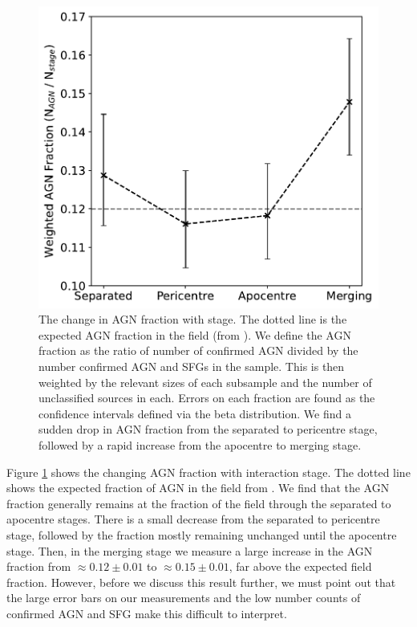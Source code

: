 \begin{figure}
\centering
\includegraphics[width=\textwidth]{Chapter3/figures/agn-frac-time.pdf}
\caption[The change in AGN fraction with stage.]{The change in AGN fraction with stage. The dotted line is the expected AGN fraction in the field (from \citet{2008AJ....135.1877E}). We define the AGN fraction as the ratio of number of confirmed AGN divided by the number confirmed AGN and SFGs in the sample. This is then weighted by the relevant sizes of each subsample and the number of unclassified sources in each. Errors on each fraction are found as the confidence intervals defined via the beta distribution. We find a sudden drop in AGN fraction from the separated to pericentre stage, followed by a rapid increase from the apocentre to merging stage.}
\label{fig:agn-frac-time}
\end{figure}

Figure \ref{fig:agn-frac-time} shows the changing AGN fraction with interaction stage. The dotted line shows the expected fraction of AGN in the field from \citet{2008AJ....135.1877E}. We find that the AGN fraction generally remains at the fraction of the field through the separated to apocentre stages. There is a small decrease from the separated to pericentre stage, followed by the fraction mostly remaining unchanged until the apocentre stage. Then, in the merging stage we measure a large increase in the AGN fraction from $\approx0.12\pm0.01$ to $\approx0.15\pm0.01$, far above the expected field fraction. However, before we discuss this result further, we must point out that the large error bars on our measurements and the low number counts of confirmed AGN and SFG make this difficult to interpret.

